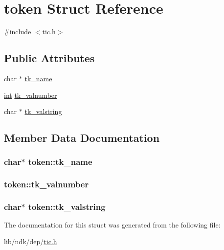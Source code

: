 \hypertarget{structtoken}{\section{token Struct Reference}
\label{structtoken}
}


{\ttfamily \#include $<$tic.\-h$>$}

\subsection*{Public Attributes}
\begin{DoxyCompactItemize}
\item 
char $\ast$ \hyperlink{structtoken_a578ac08a61e3d54033251f9e979eef2a}{tk\-\_\-name}
\item 
\hyperlink{term__entry_8h_ad65b480f8c8270356b45a9890f6499ae}{int} \hyperlink{structtoken_a7ee631c234d21b1c9e24cdd6e5d8f94a}{tk\-\_\-valnumber}
\item 
char $\ast$ \hyperlink{structtoken_ad9a8c9a13dc009d0823df94a136071a3}{tk\-\_\-valstring}
\end{DoxyCompactItemize}


\subsection{Member Data Documentation}
\hypertarget{structtoken_a578ac08a61e3d54033251f9e979eef2a}{
\subsubsection[{tk\-\_\-name}]{\setlength{\rightskip}{0pt plus 5cm}char$\ast$ token\-::tk\-\_\-name}}\label{structtoken_a578ac08a61e3d54033251f9e979eef2a}
\hypertarget{structtoken_a7ee631c234d21b1c9e24cdd6e5d8f94a}{
\subsubsection[{tk\-\_\-valnumber}]{ token\-::tk\-\_\-valnumber}}\label{structtoken_a7ee631c234d21b1c9e24cdd6e5d8f94a}
\hypertarget{structtoken_ad9a8c9a13dc009d0823df94a136071a3}{
\subsubsection[{tk\-\_\-valstring}]{\setlength{\rightskip}{0pt plus 5cm}char$\ast$ token\-::tk\-\_\-valstring}}\label{structtoken_ad9a8c9a13dc009d0823df94a136071a3}


The documentation for this struct was generated from the following file\-:\begin{DoxyCompactItemize}
\item 
lib/ndk/dep/\hyperlink{tic_8h}{tic.\-h}\end{DoxyCompactItemize}
